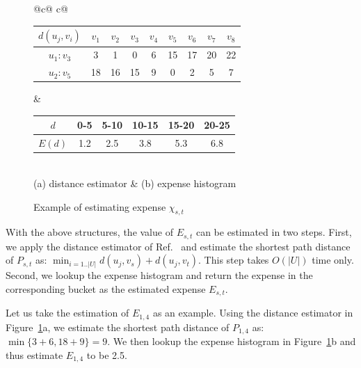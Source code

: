 \documentclass{sig-alternate}
\newcommand{\stitle}[1]{\vspace*{0.4em}\noindent{\bf #1:\/}}
\begin{document}
\begin{figure}[hbt]
    \center
    \begin{tabular}{@{}c@{ }c@{}}
        \begin{tabular}{|@{ }c@{ }|@{ }c@{ }c@{ }c@{ }c@{ }c@{ }c@{ }c@{ }c@{ }|}
            \hline
            $d(u_j,v_i)$	& $v_1$	& $v_2$	& $v_3$	& $v_4$	& $v_5$	& $v_6$	& $v_7$ & $v_8$ \\\hline
            $u_1: v_3$	    & 3	& 1	& 0	& 6 & 15 & 17 & 20 & 22	 \\
            $u_2: v_5$		& 18 & 16 & 15 & 9 & 0 & 2 & 5 & 7  \\
            \hline
        \end{tabular}
        &
        \begin{tabular}{|@{ }c@{ }|@{ }c@{ }c@{ }c@{ }c@{ }c@{ }|}
            \hline
            $d$	    & 0-5	& 5-10 & 10-15 & 15-20 & 20-25 \\\hline
            $E(d)$	& 1.2 & 2.5	& 3.8 & 5.3	& 6.8 \\
            \hline
        \end{tabular} \\
        (a) distance estimator & (b) expense histogram
    \end{tabular}
    \caption{Example of estimating expense $\chi_{s,t}$}
\label{fig:est-expense}
\end{figure}

\stitle{Estimation process}
%
With the above structures, the value of $E_{s,t}$ can be estimated in two steps.
First, we apply the distance estimator of Ref.~\cite{Potamias09}
and estimate the shortest path distance of $P_{s,t}$ as: $\min_{i=1..|U|} d(u_j,v_s)+d(u_j,v_t)$.
This step takes $O(|U|)$ time only.
Second, we lookup the expense histogram
and return the expense in the corresponding bucket as the estimated expense $E_{s,t}$.

Let us take the estimation of $E_{1,4}$ as an example.
Using the distance estimator in Figure~\ref{fig:est-expense}a, we estimate the
shortest path distance of $P_{1,4}$ as: $\min\{3+6,18+9\}=9$.
We then lookup the expense histogram in Figure~\ref{fig:est-expense}b
and thus estimate $E_{1,4}$ to be 2.5.


\end{document}

